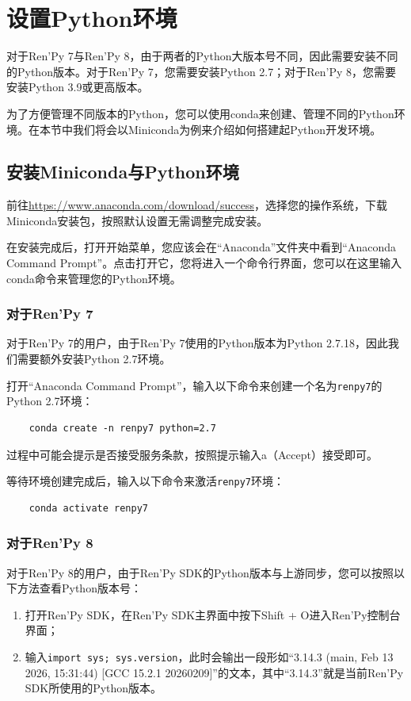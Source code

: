 \documentclass[../../Main.tex]{subfiles}
\begin{document}
\section{设置Python环境}
\label{sec:10.1}
对于Ren'Py 7与Ren'Py 8，由于两者的Python大版本号不同，因此需要安装不同的Python版本。对于Ren'Py 7，您需要安装Python 2.7；对于Ren'Py 8，您需要安装Python 3.9或更高版本。

为了方便管理不同版本的Python，您可以使用conda来创建、管理不同的Python环境。在本节中我们将会以Miniconda为例来介绍如何搭建起Python开发环境。

\subsection{安装Miniconda与Python环境}
前往\url{https://www.anaconda.com/download/success}，选择您的操作系统，下载Miniconda安装包，按照默认设置无需调整完成安装。


在安装完成后，打开开始菜单，您应该会在“Anaconda”文件夹中看到“Anaconda Command Prompt”。点击打开它，您将进入一个命令行界面，您可以在这里输入conda命令来管理您的Python环境。

\subsubsection{对于Ren'Py 7}
对于Ren'Py 7的用户，由于Ren'Py 7使用的Python版本为Python 2.7.18，因此我们需要额外安装Python 2.7环境。

打开“Anaconda Command Prompt”，输入以下命令来创建一个名为\verb|renpy7|的Python 2.7环境：
\begin{verbatim}
    conda create -n renpy7 python=2.7
\end{verbatim}

过程中可能会提示是否接受服务条款，按照提示输入a（Accept）接受即可。

等待环境创建完成后，输入以下命令来激活\verb|renpy7|环境：
\begin{verbatim}
    conda activate renpy7
\end{verbatim}

\subsubsection{对于Ren'Py 8}
对于Ren'Py 8的用户，由于Ren'Py SDK的Python版本与上游同步，您可以按照以下方法查看Python版本号：
\begin{enumerate}
    \item 打开Ren'Py SDK，在Ren'Py SDK主界面中按下Shift + O进入Ren'Py控制台界面；
    \item 输入\verb|import sys; sys.version|，此时会输出一段形如“3.14.3 (main, Feb 13 2026, 15:31:44) [GCC 15.2.1 20260209]”的文本，其中“3.14.3”就是当前Ren'Py SDK所使用的Python版本。
\end{enumerate}
\end{document}
